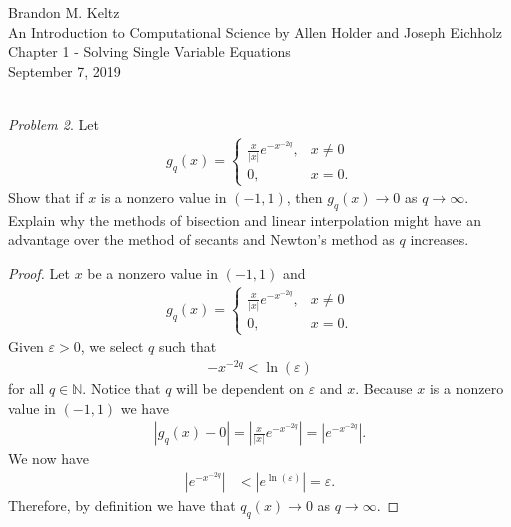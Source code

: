 \documentclass{article}
\begin{document}
	
	\begin{flushleft}	
	
		Brandon M. Keltz\\
		An Introduction to Computational Science by Allen Holder and Joseph Eichholz\\
		Chapter 1 - Solving Single Variable Equations\\
		September 7, 2019\\\
		
		\textit{Problem 2}. Let 
			\begin{align*}
				g_q(x) = \begin{cases}
					\frac{x}{\left| x \right|} e^{-x^{-2q}}, & x \neq 0 \\
					0, & x = 0.
					\end{cases}
			\end{align*}
			Show that if $x$ is a nonzero value in $\left( -1, 1 \right)$, then $g_q (x) \to 0$ as $q \to \infty$. Explain why the methods of bisection and linear interpolation might have an advantage over the method of secants and Newton's method as $q$ increases.
			
			\begin{proof} 
			
				Let $x$ be a nonzero value in $(-1, 1)$ and 
				\begin{align*}
					g_q(x) = \begin{cases}
					\frac{x}{\left| x \right|} e^{-x^{-2q}}, & x \neq 0 \\
					0, & x = 0.
					\end{cases}
				\end{align*}
				Given $\varepsilon > 0$, we select $q$ such that
				\begin{align*}
					-x^{-2 q} < \ln \left( \varepsilon \right)
				\end{align*}
				for all $q \in \mathbb{N}$. Notice that $q$ will be dependent on $\varepsilon$ and $x$. Because $x$ is a nonzero value in $\left( -1, 1 \right)$ we have
				\begin{align*}
					\left| g_q(x) - 0 \right| = \left| \frac{x}{\left| x \right|} e^{-x^{-2q}} \right| = \left| e^{-x^{-2q}} \right|.
				\end{align*}
				We now have
				\begin{align*}
					\left| e^{-x^{-2q}} \right| & < \left| e^{\ln \left( \varepsilon \right)} \right| = \varepsilon.
				\end{align*}
				Therefore, by definition we have that $q_q(x) \to 0$ as $q \to \infty$.
				

\end{proof}
\end{flushleft}
\end{document}
